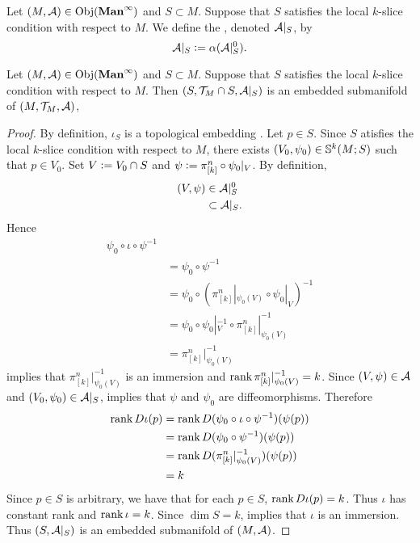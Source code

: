 \documentclass{book}
\begin{document}
	\begin{defn}
			Let $(M, \MA) \in \Obj(\Maninf)$ and $S \subset M$. Suppose that $S$ satisfies the local $k$-slice condition with respect to $M$. We define the , denoted $\MA|_S$, by 
			$$\MA|_S \defeq \al(\MA|_S^0).$$
	\end{defn}
	
	\begin{ex}
		Let $(M, \MA) \in \Obj(\Maninf)$ and $S \subset M$. Suppose that $S$ satisfies the local $k$-slice condition with respect to $M$. Then $(S, \MT_M \cap S, \MA|_S)$ is an embedded submanifold of $(M, \MT_M, \MA)$,
	\end{ex}

	\begin{proof} 
		By definition, $\iota_S$ is a topological embedding . Let $p \in S$. Since $S$ atisfies the local $k$-slice condition with respect to $M$, there exists $(V_0, \psi_0) \in \S^k(M; S)$ such that $p \in V_0$. Set $V \defeq V_0 \cap S$ and $\psi \defeq \pi^n_{[k]} \circ \psi_0|_V$. By definition,  
		\begin{align*}
			(V, \psi) 
			& \in \MA|_S^0 \\
			& \subset \MA|_S.
		\end{align*}
		Hence 
		\begin{align*}
			\psi_0 \circ \iota \circ \psi^{-1} \\
			& = \psi_0 \circ \psi^{-1} \\
			& = \psi_0 \circ (\pi^n_{[k]}|_{\psi_0(V)} \circ \psi_0|_V)^{-1} \\
			& = \psi_0 \circ \psi_0|_V^{-1} \circ \pi^n_{[k]}|_{\psi_0(V)}^{-1} \\
			& = \pi^n_{[k]}|_{\psi_0(V)}^{-1} 
		\end{align*}
		 implies that $\pi^n_{[k]}|_{\psi_0(V)}^{-1}$ is an immersion and $\rnk \pi^n_{[k]}|_{\psi_0(V)}^{-1} = k$. Since $(V, \psi) \in \MA$ and $(V_0, \psi_0) \in \MA|_S$,  implies that $\psi$ and $\psi_0$ are diffeomorphisms. Therefore
		\begin{align*}
			\rnk D \iota (p)
			& = \rnk D (\psi_0 \circ \iota \circ \psi^{-1})(\psi(p)) \\
			& = \rnk D (\psi_0 \circ \psi^{-1})(\psi(p)) \\
			& = \rnk D (\pi^n_{[k]}|_{\psi_0(V)}^{-1})(\psi(p)) \\
			& = k
		\end{align*}  
		Since $p \in S$ is arbitrary, we have that for each $p \in S$, $\rnk D \iota (p) = k$. Thus $\iota$ has constant rank and $\rnk \iota = k$. Since $\dim S = k$,  implies that $\iota$ is an immersion. Thus $(S, \MA|_S)$ is an embedded submanifold of $(M, \MA)$.
	\end{proof}
	
\end{document}
